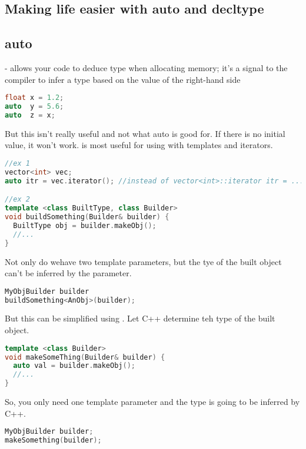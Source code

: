 \subsection{Making life easier with auto and decltype}

\subsection{auto}

 - allows your code to deduce type when allocating memory; it's a signal to the compiler to infer a type based on the value of the right-hand side

\begin{lstlisting}[language=C++]
float x = 1.2;
auto  y = 5.6;
auto  z = x;
\end{lstlisting}

But this isn't really useful and not what auto is good for. If there is no initial value, it won't work.  is most useful for using with templates and iterators.

\begin{lstlisting}[language=C++]
//ex 1
vector<int> vec;
auto itr = vec.iterator(); //instead of vector<int>::iterator itr = ...

//ex 2
template <class BuiltType, class Builder>
void buildSomething(Builder& builder) {
  BuiltType obj = builder.makeObj();
  //...
}
\end{lstlisting}

Not only do wehave two template parameters, but the tye of the built object can't be inferred by the parameter.

\begin{lstlisting}[language=C++]
MyObjBuilder builder
buildSomething<AnObj>(builder);
\end{lstlisting}

But this can be simplified using . Let C++ determine teh type of the built object.

\begin{lstlisting}[language=C++]
template <class Builder>
void makeSomeThing(Builder& builder) {
  auto val = builder.makeObj();
  //...
}
\end{lstlisting}

So, you only need one template parameter and the type is going to be inferred by C++.

\begin{lstlisting}[language=C++]
MyObjBuilder builder;
makeSomething(builder);
\end{lstlisting}


